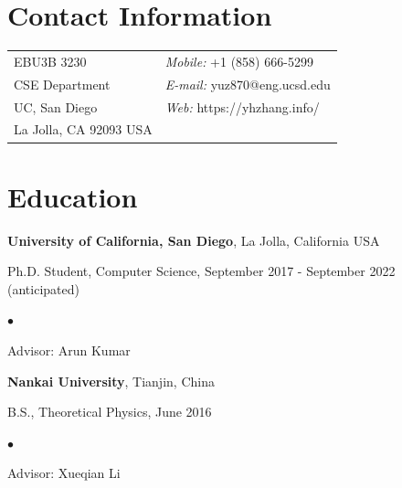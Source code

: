 \documentclass[margin,line]{res}
\newenvironment{list1}{
 \begin{list}{\ding{113}}{%
   \setlength{\itemsep}{0in}
   \setlength{\parsep}{0in} \setlength{\parskip}{0in}
   \setlength{\topsep}{0in} \setlength{\partopsep}{0in} 
   \setlength{\leftmargin}{0.17in}}}{\end{list}}
\newenvironment{list2}{
 \begin{list}{$\bullet$}{%
   \setlength{\itemsep}{0in}
   \setlength{\parsep}{0in} \setlength{\parskip}{0in}
   \setlength{\topsep}{0in} \setlength{\partopsep}{0in} 
   \setlength{\leftmargin}{0.2in}}}{\end{list}}
\begin{document}
\sloppy


\begin{resume}
\section{\sc Contact Information}
\vspace{.05in}
\begin{tabular}{@{}p{2in}p{4in}}
EBU3B 3230       & {\it Mobile:} +1 (858) 666-5299 \\       
CSE Department  & {\it E-mail:} yuz870@eng.ucsd.edu\\
UC, San Diego & {\it Web:} https://yhzhang.info/ \\    
La Jolla, CA 92093 USA & \\   
\end{tabular}

\section{\sc Education}
{\bf University of California, San Diego}, La Jolla, California USA\\
\vspace*{-.1in}
\begin{list1}
\item[] Ph.D. Student, Computer Science, September 2017 - September 2022 (anticipated)
\begin{list2}
\vspace*{.05in}
\item Advisor: Arun Kumar
\end{list2}
\end{list1}

{\bf Nankai University}, Tianjin, China\\
\vspace*{-.1in}
\begin{list1}
\item[] B.S., Theoretical Physics, June 2016
\begin{list2}
\item Advisor: Xueqian Li
\end{list2}
\end{list1}



\end{resume}
\end{document}
